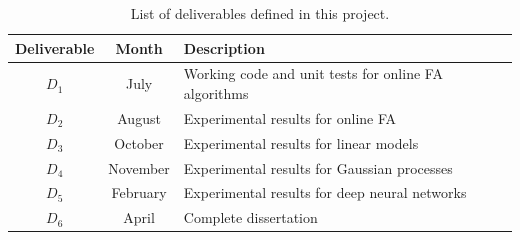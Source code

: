 \documentclass[a4paper,11pt]{article}
\begin{document}
\begin{table}[htbp]
    \begin{center}
        \begin{tabular}{|c|c|l|}
        \hline
        \textbf{Deliverable} & \textbf{Month} & \textbf{Description} \\
        \hline
        $D_1$ & July & Working code and unit tests for online FA algorithms \\
        $D_2$ & August & Experimental results for online FA \\
        $D_3$ & October & Experimental results for linear models \\
        $D_4$ & November & Experimental results for Gaussian processes \\
        $D_5$ & February & Experimental results for deep neural networks \\
        $D_6$ & April & Complete dissertation \\
        \hline
        \end{tabular} 
    \end{center}
    \caption{List of deliverables defined in this project.}
    \label{fig:deliverables}
\end{table}


\newpage


{\small
}
\end{document}
